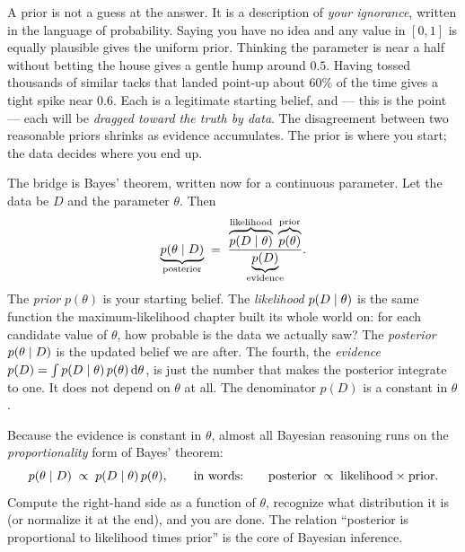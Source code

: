 \begin{intuitionbox}
A prior is not a guess at the answer. It is a description of \emph{your ignorance},
written in the language of probability. Saying you have no idea and any value in $[0,1]$ is
equally plausible gives the uniform prior. Thinking the parameter is near a half without
betting the house gives a gentle hump around $0.5$. Having tossed thousands of similar tacks
that landed point-up about $60\%$ of the time gives a tight spike near $0.6$. Each is a legitimate
starting belief, and --- this is the point --- each will be \emph{dragged toward the
truth by data}. The disagreement between two reasonable priors shrinks as evidence
accumulates. The prior is where you start; the data decides where you end up.
\end{intuitionbox}

The bridge is Bayes' theorem, written now for a continuous parameter. Let the data be $D$
and the parameter $\theta$. Then
\begin{equation}
  \underbrace{p(\theta \mid D)}_{\text{posterior}}
  \;=\;
  \frac{\overbrace{p(D \mid \theta)}^{\text{likelihood}}\;\overbrace{p(\theta)}^{\text{prior}}}
       {\underbrace{p(D)}_{\text{evidence}}}.
  \label{ch31:bayes-continuous}
\end{equation}
The \emph{prior} $p(\theta)$ is
your starting belief. The \emph{likelihood} $p(D \mid \theta)$ is the same function the
maximum-likelihood chapter built its whole world on: for each candidate value of $\theta$,
how probable is the data we actually saw? The \emph{posterior} $p(\theta \mid D)$ is the
updated belief we are after. The fourth, the \emph{evidence} $p(D) = \int p(D \mid
\theta)\, p(\theta)\, \mathrm{d}\theta$, is just the number that makes the posterior integrate to
one. It does not depend on $\theta$ at all. The denominator $p(D)$ is a
constant in $\theta$.

\begin{focusbox}
Because the evidence is constant in $\theta$, almost all Bayesian reasoning runs on the
\emph{proportionality} form of Bayes' theorem:
\[
  p(\theta \mid D)\;\propto\; p(D \mid \theta)\, p(\theta),
  \qquad\text{in words:}\qquad
  \text{posterior} \;\propto\; \text{likelihood} \times \text{prior}.
\]
Compute the right-hand side as a function of $\theta$, recognize what distribution it is
(or normalize it at the end), and you are done. The relation ``posterior is proportional to
likelihood times prior'' is the core of Bayesian inference.
\end{focusbox}

